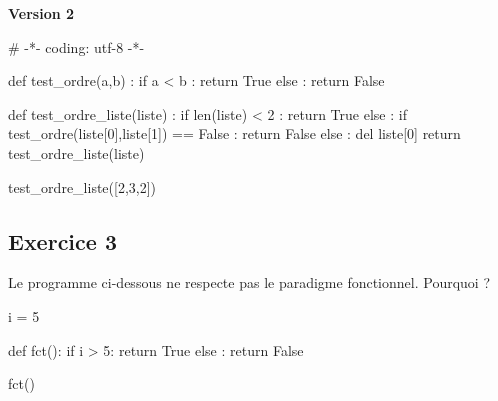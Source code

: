 \documentclass[
  letterpaper,
  DIV=11,
  numbers=noendperiod]{scrartcl}
\newenvironment{Shaded}{\begin{snugshade}}{\end{snugshade}}
\newcommand{\BuiltInTok}[1]{\textcolor[rgb]{0.00,0.23,0.31}{#1}}
\newcommand{\CommentTok}[1]{\textcolor[rgb]{0.37,0.37,0.37}{#1}}
\newcommand{\ControlFlowTok}[1]{\textcolor[rgb]{0.00,0.23,0.31}{#1}}
\newcommand{\DecValTok}[1]{\textcolor[rgb]{0.68,0.00,0.00}{#1}}
\newcommand{\KeywordTok}[1]{\textcolor[rgb]{0.00,0.23,0.31}{#1}}
\newcommand{\NormalTok}[1]{\textcolor[rgb]{0.00,0.23,0.31}{#1}}
\newcommand{\OperatorTok}[1]{\textcolor[rgb]{0.37,0.37,0.37}{#1}}
\newcommand{\VariableTok}[1]{\textcolor[rgb]{0.07,0.07,0.07}{#1}}
\begin{document}
\textbf{Version 2}

\begin{Shaded}
\begin{Highlighting}[]
\CommentTok{\# {-}*{-} coding: utf{-}8 {-}*{-}}

\KeywordTok{def}\NormalTok{ test\_ordre(a,b) :}
    \ControlFlowTok{if}\NormalTok{ a }\OperatorTok{\textless{}}\NormalTok{ b :}
        \ControlFlowTok{return} \VariableTok{True}
    \ControlFlowTok{else}\NormalTok{ :}
        \ControlFlowTok{return} \VariableTok{False}

\KeywordTok{def}\NormalTok{ test\_ordre\_liste(liste) :}
    \ControlFlowTok{if} \BuiltInTok{len}\NormalTok{(liste) }\OperatorTok{\textless{}} \DecValTok{2}\NormalTok{ :}
        \ControlFlowTok{return} \VariableTok{True}
    \ControlFlowTok{else}\NormalTok{ :}
        \ControlFlowTok{if}\NormalTok{ test\_ordre(liste[}\DecValTok{0}\NormalTok{],liste[}\DecValTok{1}\NormalTok{]) }\OperatorTok{==} \VariableTok{False}\NormalTok{ :}
            \ControlFlowTok{return} \VariableTok{False}
        \ControlFlowTok{else}\NormalTok{ :}
            \KeywordTok{del}\NormalTok{ liste[}\DecValTok{0}\NormalTok{]}
            \ControlFlowTok{return}\NormalTok{ test\_ordre\_liste(liste)}

\NormalTok{test\_ordre\_liste([}\DecValTok{2}\NormalTok{,}\DecValTok{3}\NormalTok{,}\DecValTok{2}\NormalTok{])}
\end{Highlighting}
\end{Shaded}

\hypertarget{fa-solid-pencil-alt-exercice-3}{%
\subsection{\texorpdfstring{ Exercice
3}{ Exercice 3}}\label{fa-solid-pencil-alt-exercice-3}}

Le programme ci-dessous ne respecte pas le paradigme fonctionnel.
Pourquoi ?

\begin{Shaded}
\begin{Highlighting}[]
\NormalTok{i }\OperatorTok{=} \DecValTok{5}

\KeywordTok{def}\NormalTok{ fct():}
  \ControlFlowTok{if}\NormalTok{ i }\OperatorTok{\textgreater{}} \DecValTok{5}\NormalTok{:}
    \ControlFlowTok{return} \VariableTok{True}
  \ControlFlowTok{else}\NormalTok{ :}
    \ControlFlowTok{return} \VariableTok{False}

\NormalTok{fct()}
\end{Highlighting}
\end{Shaded}
\end{document}
